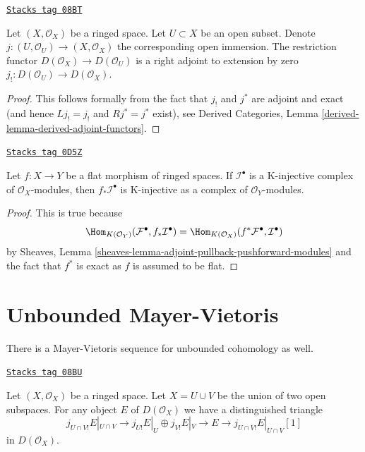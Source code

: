 \begin{lemma}
\label{cohomology-lemma-adjoint-lower-shriek-restrict}
\href{https://stacks.math.columbia.edu/tag/08BT}{\texttt{Stacks tag 08BT}}

Let $(X, \mathcal{O}_X)$ be a ringed space. Let $U \subset X$ be an
open subset. Denote $j : (U, \mathcal{O}_U) \to (X, \mathcal{O}_X)$
the corresponding open immersion. The restriction functor
$D(\mathcal{O}_X) \to D(\mathcal{O}_U)$ is a right adjoint to
extension by zero $j_! : D(\mathcal{O}_U) \to D(\mathcal{O}_X)$.
\end{lemma}

\begin{proof}
This follows formally from the fact that $j_!$ and $j^*$ are adjoint and
exact (and hence $Lj_! = j_!$ and $Rj^* = j^*$ exist), see
Derived Categories, Lemma \ref{derived-lemma-derived-adjoint-functors}.
\end{proof}

\begin{lemma}
\label{cohomology-lemma-K-injective-flat}
\href{https://stacks.math.columbia.edu/tag/0D5Z}{\texttt{Stacks tag 0D5Z}}

Let $f : X \to Y$ be a flat morphism of ringed spaces.
If $\mathcal{I}^\bullet$ is a K-injective complex of $\mathcal{O}_X$-modules,
then $f_*\mathcal{I}^\bullet$ is K-injective as a complex of
$\mathcal{O}_Y$-modules.
\end{lemma}

\begin{proof}
This is true because
$$
\Hom_{K(\mathcal{O}_Y)}(\mathcal{F}^\bullet, f_*\mathcal{I}^\bullet)
=
\Hom_{K(\mathcal{O}_X)}(f^*\mathcal{F}^\bullet, \mathcal{I}^\bullet)
$$
by
Sheaves, Lemma
\ref{sheaves-lemma-adjoint-pullback-pushforward-modules}
and the fact that $f^*$ is exact as $f$ is assumed to be flat.
\end{proof}

\section{Unbounded Mayer-Vietoris}
\label{cohomology-section-unbounded-mayer-vietoris}
There is a Mayer-Vietoris sequence for unbounded cohomology as well.

\begin{lemma}
\label{cohomology-lemma-exact-sequence-lower-shriek}
\href{https://stacks.math.columbia.edu/tag/08BU}{\texttt{Stacks tag 08BU}}

Let $(X, \mathcal{O}_X)$ be a ringed space.
Let $X = U \cup V$ be the union of two open subspaces.
For any object $E$ of $D(\mathcal{O}_X)$ we have a distinguished
triangle
$$
j_{U \cap V!}E|_{U \cap V} \to
j_{U!}E|_U \oplus j_{V!}E|_V \to E \to
j_{U \cap V!}E|_{U \cap V}[1]
$$
in $D(\mathcal{O}_X)$.
\end{lemma}

